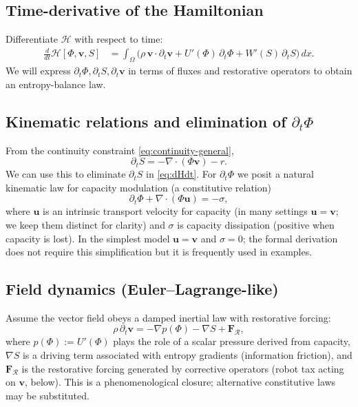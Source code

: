 \documentclass[12pt]{article}
\begin{document}
\subsection{Time-derivative of the Hamiltonian}
Differentiate $\mathcal H$ with respect to time:
\begin{align}
\frac{d}{dt}\mathcal H[\Phi,\mathbf v,S]
&= \int_{\Omega}\Big(\rho\,\mathbf v\cdot\partial_t\mathbf v + U'(\Phi)\,\partial_t\Phi + W'(S)\,\partial_t S\Big)\,dx.\label{eq:dHdt}
\end{align}
We will express $\partial_t\Phi,\partial_t S,\partial_t\mathbf v$ in terms of fluxes and restorative operators to obtain an entropy-balance law.

\subsection{Kinematic relations and elimination of $\partial_t\Phi$}
From the continuity constraint \eqref{eq:continuity-general},
\[
\partial_t S = -\nabla\!\cdot(\Phi\mathbf v) - r.
\]
We can use this to eliminate $\partial_t S$ in \eqref{eq:dHdt}. For $\partial_t\Phi$ we posit a natural kinematic law for capacity modulation (a constitutive relation)
\[
\partial_t\Phi + \nabla\!\cdot(\Phi\mathbf u) = -\sigma,
\]
where $\mathbf u$ is an intrinsic transport velocity for capacity (in many settings $\mathbf u=\mathbf v$; we keep them distinct for clarity) and $\sigma$ is capacity dissipation (positive when capacity is lost). In the simplest model $\mathbf u=\mathbf v$ and $\sigma=0$; the formal derivation does not require this simplification but it is frequently used in examples.

\subsection{Field dynamics (Euler–Lagrange-like)}
Assume the vector field obeys a damped inertial law with restorative forcing:
\[
\rho\,\partial_t\mathbf v = -\nabla p(\Phi) - \nabla S + \mathbf F_{\mathcal R},
\]
where $p(\Phi):=U'(\Phi)$ plays the role of a scalar pressure derived from capacity, $\nabla S$ is a driving term associated with entropy gradients (information friction), and $\mathbf F_{\mathcal R}$ is the restorative forcing generated by corrective operators (robot tax acting on $\mathbf v$, below). This is a phenomenological closure; alternative constitutive laws may be substituted.
\end{document}
